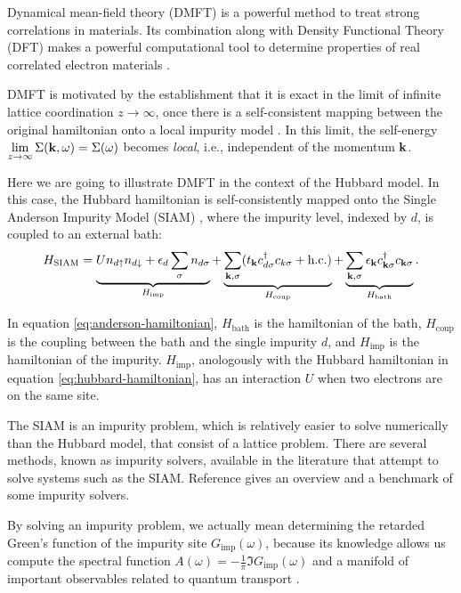 \documentclass[12pt]{report}
\begin{document}
Dynamical mean-field theory (DMFT) is a powerful method to treat strong correlations in materials. Its combination along with Density Functional Theory (DFT) makes a powerful computational tool to determine properties of real correlated electron materials \cite{hauleweb, haule_real_materials}.

DMFT is motivated by the establishment that it is exact in the limit of infinite lattice coordination $z \to \infty$, once there is a self-consistent mapping between the original hamiltonian onto a local impurity model \cite{thesis_dmft_graz}. In this limit, the self-energy $\displaystyle{\lim_{z \to \infty}\Sigma({\vb{k}},\omega) = \Sigma(\omega)}$ becomes \textit{local}, i.e., independent of the momentum ${\vb{k}}$.

Here we are going to illustrate DMFT in the context of the Hubbard model. In this case, the Hubbard hamiltonian is self-consistently mapped onto the Single Anderson Impurity Model (SIAM) \cite{impurity-solvers, georges1996}, where the impurity level, indexed by $d$, is coupled to an external bath:
\begin{equation} \label{eq:anderson-hamiltonian}
H_{\text{SIAM}} = \underbrace{U n_{d{\uparrow}} n_{d{\downarrow}} + \epsilon_d \sum_{{\sigma}} n_{d{\sigma}}}_{H_{\text{imp}}}
+ \underbrace{\sum_{{\vb{k}},{\sigma}} (t_{\vb{k}} c_{d{\sigma}}^\dagger c_{k{\sigma}} + {\text{h.c.}})}_{H_{\text{coup}}}
+ \underbrace{\sum_{{\vb{k}},{\sigma}} \epsilon_{\vb{k}} c_{{\vb{k}}{\sigma}}^\dagger c_{{\vb{k}}{\sigma}}}_{H_{\text{bath}}}.
\end{equation}

In equation \ref{eq:anderson-hamiltonian}, $H_{\text{bath}}$ is the hamiltonian of the bath, $H_{\text{coup}}$ is the coupling between the bath and the single impurity $d$, and $H_{\text{imp}}$ is the hamiltonian of the impurity. $H_{\text{imp}}$, anologously with the Hubbard hamiltonian in equation \ref{eq:hubbard-hamiltonian}, has an interaction $U$ when two electrons are on the same site.

The SIAM is an impurity problem, which is relatively easier to solve numerically than the Hubbard model, that consist of a lattice problem. There are several methods, known as impurity solvers, available in the literature that attempt to solve systems such as the SIAM. Reference \cite{impurity-solvers} gives an overview and a benchmark of some impurity solvers.

By solving an impurity problem, we actually mean determining the retarded Green's function of the impurity site $G_{\text{imp}}(\omega)$, because its knowledge allows us compute the spectral function $\displaystyle{A(\omega) = - \frac{1}{\pi} \Im{G_{\text{imp}}(\omega)}}$ \cite{bruus} and a manifold of important observables related to quantum transport \cite{pedagogical-gfs}.
\end{document}
